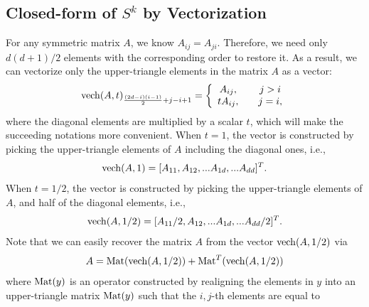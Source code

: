 \documentclass{article}
\theoremstyle{remark}
\begin{document}
\subsection{Closed-form of $S^k$ by Vectorization}
For any symmetric matrix $A$, we know $A_{ij} = A_{ji}$. Therefore, we need only ${d(d+1)}/{2}$ elements with the corresponding order to restore it. As a result, we can vectorize only the upper-triangle elements in the matrix $A$ as a vector: 
\[
{\rm vech}(A,t)_{\frac{(2d-i)(i-1)}{2}+j-i+1} = \left\{
\begin{array}{cc}
A_{ij},    &\quad j>i\\
tA_{ij},   &\quad j=i,
\end{array}
\right.
\]
where the diagonal elements are multiplied by a scalar $t$, which will make the succeeding notations more convenient. When $t=1$, the vector is constructed by picking the upper-triangle elements of $A$ including the diagonal ones, i.e., 
\[
{\rm vech}(A,1) = [A_{11},A_{12},...A_{1d},...A_{dd}]^T.
\]
When $t=1/2$, the vector is constructed by picking the upper-triangle elements of $A$, and half of the diagonal elements, i.e.,
\[
{\rm vech}(A,{1}/{2}) = [A_{11}/2,A_{12},...A_{1d},...A_{dd}/2]^T.
\]
Note that we can easily recover the matrix $A$ from the vector ${\rm vech}(A,1/2)$ via
\[
A = {\rm Mat} ({\rm vech}(A,1/2)) + {\rm Mat}^T ({\rm vech}(A,1/2)) 
\]
where ${\rm Mat}(y)$ is an operator constructed by realigning the elements in $y$ into an upper-triangle matrix ${\rm Mat} (y)$ such that the $i,j$-th elements are equal to
\end{document}

